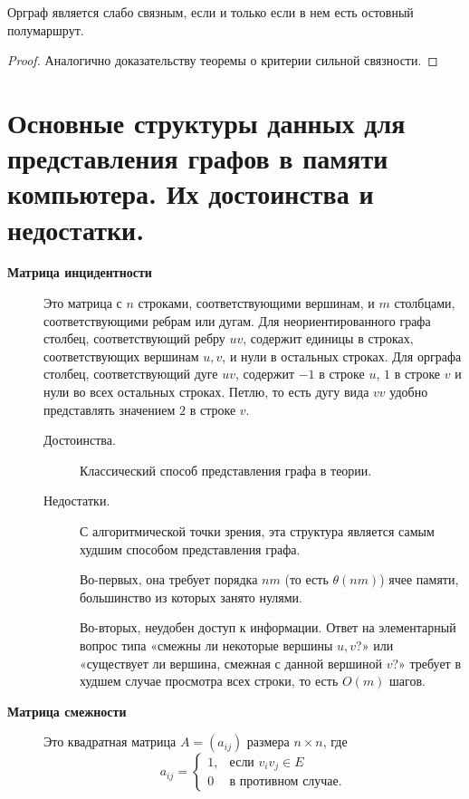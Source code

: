 \begin{theorem}
    Орграф является слабо связным, если и только если в нем есть остовный полумаршрут.
\end{theorem}

\begin{proof}
    Аналогично доказательству теоремы о критерии сильной связности.
\end{proof}

\section{Основные структуры данных для представления графов в памяти компьютера. Их достоинства и недостатки.}

\begin{note}\leavevmode
    \begin{description}

        \item[ \textbf{Матрица инцидентности}]
              Это матрица с $ n $ строками, соответствующими вершинам, и $ m $ столбцами, соответствующими ребрам или дугам. Для неориентированного графа столбец, соответствующий ребру $ uv $, содержит единицы в строках, соответствующих вершинам $ u,v $, и нули в остальных строках. Для орграфа столбец, соответствующий дуге $ uv $, содержит $ -1 $ в строке $ u $, $ 1 $ в строке $ v $ и нули во всех остальных строках. Петлю, то есть дугу вида $ vv $ удобно представлять значением $ 2 $ в строке $ v $.

              \begin{description}
                  \item[Достоинства.] Классический способ представления графа в теории.
                  \item[Недостатки.] С алгоритмической точки зрения, эта структура является самым худшим способом представления графа.

                        Во-первых, она требует порядка $ nm $ (то есть $ \theta(nm) $) ячее памяти, большинство из которых занято нулями.

                        Во-вторых, неудобен доступ к информации. Ответ на элементарный вопрос типа «смежны ли некоторые вершины $ u,v $?» или «существует ли вершина, смежная с данной вершиной $ v $?» требует в худшем случае просмотра всех строки, то есть $ O(m) $ шагов.
              \end{description}

        \item[ \textbf{Матрица смежности}]
              Это квадратная матрица $ A = (a_{ij}) $ размера $ n \times n $, где
              \[
                  a_{ij} = \left\{\begin{array}{ll}
                      1, & \text{если } v_iv_j \in E  \\
                      0  & \text{в противном случае.}
                  \end{array}\right.
              \]


\end{description}
\end{note}
